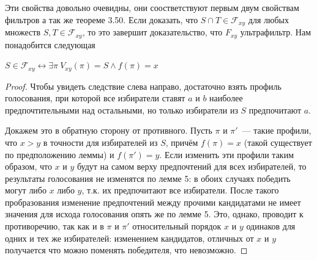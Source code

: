 Эти свойства довольно очевидны, они соостветствуют первым двум свойствам фильтров а так же теореме 3.50. Если доказать, что $S\cap T\in\mathcal{F}_{xy}$ для любых множеств $S, T\in\mathcal{F}_{xy}$, то это завершит доказательство, что $F_{xy}$ ультрафильтр. Нам понадобится следующая

\begin{lemma}
$S\in\mathcal{F}_{xy} \leftrightarrow \exists \pi\ V_{xy}(\pi) = S \land f(\pi) = x$
\end{lemma}
\begin{proof}
Чтобы увидеть следствие слева направо, достаточно взять профиль голосования, при которой все избиратели ставят $a$ и $b$ наиболее предпочтительными над остальными, но только избиратели из $S$ предпочитают $a$.

Докажем это в обратную сторону от противного. Пусть $\pi$ и $\pi'$~— такие профили, что $x>y$ в точности для избирателей из $S$, причём $f(\pi)=x$ (такой существует по предположению леммы) и $f(\pi') = y$. Если изменить эти профили таким образом, что $x$ и $y$ будут на самом верху предпочтений для всех избирателей, то результаты голосования не изменятся по лемме 5: в обоих случаях победить могут либо $x$ либо $y$, т.к. их предпочитают все избиратели. После такого пробразования изменение предпочтений между прочими кандидатами не имеет значения для исхода голосования опять же по лемме 5. Это, однако, проводит к противоречию, так как и в $\pi$ и $\pi'$ относительный порядок $x$ и $y$ одинаков для одних и тех же избирателей: изменением кандидатов, отличных от $x$ и $y$ получается что можно поменять победителя, что невозможно.
\end{proof}

